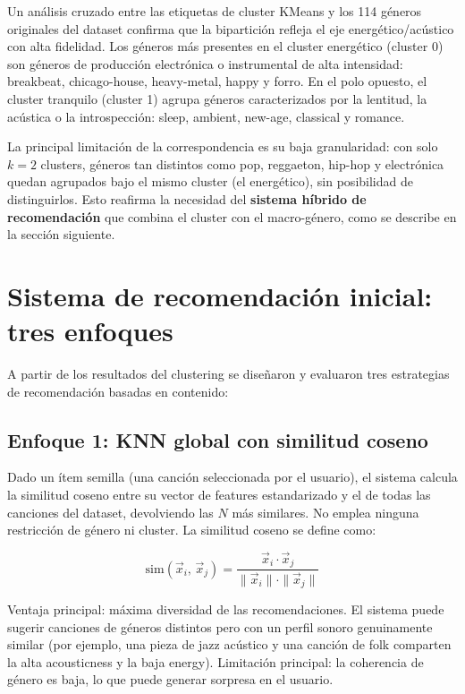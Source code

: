 \documentclass[12pt, a4paper]{book}
\theoremstyle{definition}
\begin{document}
Un análisis cruzado entre las etiquetas de cluster KMeans y los 114 géneros
originales del dataset confirma que la bipartición refleja el eje
energético/acústico con alta fidelidad. Los géneros más presentes en el
cluster energético (cluster 0) son géneros de producción electrónica o
instrumental de alta intensidad: breakbeat, chicago-house, heavy-metal,
happy y forro. En el polo opuesto, el cluster tranquilo (cluster 1) agrupa
géneros caracterizados por la lentitud, la acústica o la introspección:
sleep, ambient, new-age, classical y romance.

La principal limitación de la correspondencia es su baja granularidad: con
solo $k=2$ clusters, géneros tan distintos como pop, reggaeton, hip-hop y
electrónica quedan agrupados bajo el mismo cluster (el energético), sin
posibilidad de distinguirlos. Esto reafirma la necesidad del \textbf{sistema
híbrido de recomendación} que combina el cluster con el macro-género, como se
describe en la sección siguiente.

\section{Sistema de recomendación inicial: tres enfoques}
\label{sec:recomendador_inicial}

A partir de los resultados del clustering se diseñaron y evaluaron tres
estrategias de recomendación basadas en contenido:

\subsection{Enfoque 1: KNN global con similitud coseno}

Dado un ítem semilla (una canción seleccionada por el usuario), el sistema
calcula la similitud coseno entre su vector de features estandarizado y el de
todas las canciones del dataset, devolviendo las $N$ más similares. No emplea
ninguna restricción de género ni cluster. La similitud coseno se define como:

\begin{equation}
\label{eq:coseno_inicial}
\text{sim}(\vec{x}_i,\, \vec{x}_j) =
  \frac{\vec{x}_i \cdot \vec{x}_j}{\|\vec{x}_i\| \cdot \|\vec{x}_j\|}
\end{equation}

Ventaja principal: máxima diversidad de las recomendaciones. El sistema puede
sugerir canciones de géneros distintos pero con un perfil sonoro genuinamente
similar (por ejemplo, una pieza de jazz acústico y una canción de folk
comparten la alta acousticness y la baja energy). Limitación principal:
la coherencia de género es baja, lo que puede generar sorpresa en el usuario.
\end{document}
